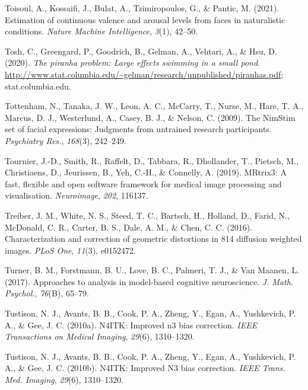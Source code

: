 \documentclass[11pt,american,]{memoir} %
\begin{document}
\leavevmode\hypertarget{ref-Toisoul2021-yc}{}%
Toisoul, A., Kossaifi, J., Bulat, A., Tzimiropoulos, G., \& Pantic, M. (2021). Estimation of continuous valence and arousal levels from faces in naturalistic conditions. \emph{Nature Machine Intelligence}, \emph{3}(1), 42--50.

\leavevmode\hypertarget{ref-Tosh2020-sf}{}%
Tosh, C., Greengard, P., Goodrich, B., Gelman, A., Vehtari, A., \& Hsu, D. (2020). \emph{The piranha problem: Large effects swimming in a small pond}. \url{http://www.stat.columbia.edu/~gelman/research/unpublished/piranhas.pdf}; stat.columbia.edu.

\leavevmode\hypertarget{ref-Tottenham2009-vn}{}%
Tottenham, N., Tanaka, J. W., Leon, A. C., McCarry, T., Nurse, M., Hare, T. A., Marcus, D. J., Westerlund, A., Casey, B. J., \& Nelson, C. (2009). The NimStim set of facial expressions: Judgments from untrained research participants. \emph{Psychiatry Res.}, \emph{168}(3), 242--249.

\leavevmode\hypertarget{ref-Tournier2019-hh}{}%
Tournier, J.-D., Smith, R., Raffelt, D., Tabbara, R., Dhollander, T., Pietsch, M., Christiaens, D., Jeurissen, B., Yeh, C.-H., \& Connelly, A. (2019). MRtrix3: A fast, flexible and open software framework for medical image processing and visualisation. \emph{Neuroimage}, \emph{202}, 116137.

\leavevmode\hypertarget{ref-Treiber2016-mc}{}%
Treiber, J. M., White, N. S., Steed, T. C., Bartsch, H., Holland, D., Farid, N., McDonald, C. R., Carter, B. S., Dale, A. M., \& Chen, C. C. (2016). Characterization and correction of geometric distortions in 814 diffusion weighted images. \emph{PLoS One}, \emph{11}(3), e0152472.

\leavevmode\hypertarget{ref-Turner2017-fi}{}%
Turner, B. M., Forstmann, B. U., Love, B. C., Palmeri, T. J., \& Van Maanen, L. (2017). Approaches to analysis in model-based cognitive neuroscience. \emph{J. Math. Psychol.}, \emph{76}(B), 65--79.

\leavevmode\hypertarget{ref-tustison2010n4itk}{}%
Tustison, N. J., Avants, B. B., Cook, P. A., Zheng, Y., Egan, A., Yushkevich, P. A., \& Gee, J. C. (2010a). N4ITK: Improved n3 bias correction. \emph{IEEE Transactions on Medical Imaging}, \emph{29}(6), 1310--1320.

\leavevmode\hypertarget{ref-Tustison2010-tk}{}%
Tustison, N. J., Avants, B. B., Cook, P. A., Zheng, Y., Egan, A., Yushkevich, P. A., \& Gee, J. C. (2010b). N4ITK: Improved N3 bias correction. \emph{IEEE Trans. Med. Imaging}, \emph{29}(6), 1310--1320.
\end{document}
